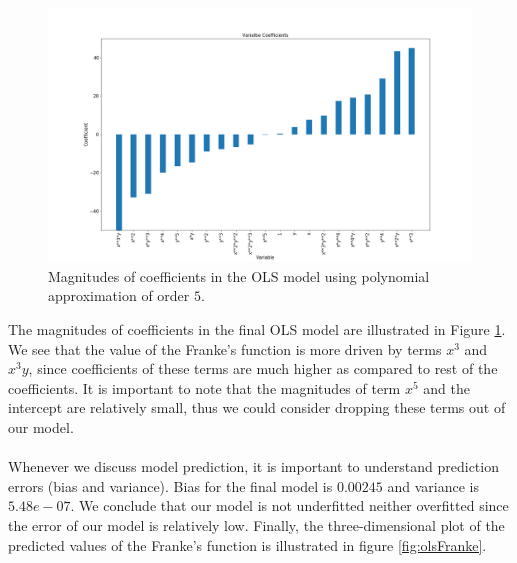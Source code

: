 \documentclass [11pt]{article}
\begin{document}
\begin{figure}[H]
\centering
\includegraphics[width=1\textwidth]{figures/coeffOLS.png}
        \caption{Magnitudes of coefficients in the OLS model using polynomial approximation of order $5$.}
        \label{fig:coeffOLS}
\end{figure}

The magnitudes of coefficients in the final OLS model are illustrated in Figure \ref{fig:coeffOLS}. We see that the value of the Franke's function is more driven by terms $x^{3}$ and $x^{3}y$, since coefficients of these terms are much higher as compared to rest of the coefficients. It is important to note that the magnitudes of term $x^{5}$ and the intercept are relatively small, thus we could consider dropping these terms out of our model.\\
\\
Whenever we discuss model prediction, it is important to understand prediction errors (bias and variance). Bias for the final model is $0.00245$ and variance is $5.48e-07$. We conclude that our model is not underfitted neither overfitted since the error of our model is relatively low. Finally, the three-dimensional plot of the predicted values of the Franke’s function is illustrated in figure \ref{fig:olsFranke}.
\end{document}
